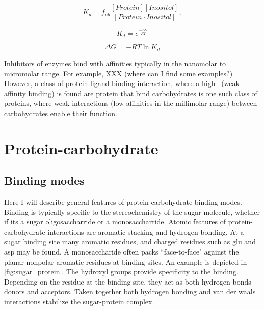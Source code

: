      \begin{equation}
        K_{d} = f_{ub}\frac{\left[ Protein \right]\left[ Inositol \right]}{\left[Protein \cdot Inositol\right]},
     \end{equation}
     
     \begin{equation}
        K_{d} = e^{\frac{-\Delta G}{RT}}
     \end{equation}

     \begin{equation}
        \Delta G = -RT\ln K_d
     \end{equation}
     

Inhibitors of enzymes bind with affinities typically in the nanomolar to micromolar range.  For example, XXX (where can I find some examples?) However, a class of protein-ligand binding interaction, where a high \KD\ (weak affinity binding) is found are protein that bind carbohydrates is one such class of proteins, where weak interactions (low affinities in the millimolar range) between carbohydrates enable their function.

\section{Protein-carbohydrate}

\subsection{Binding modes}
Here I will describe general features of protein-carbohydrate binding modes. Binding is typically specific to the stereochemistry of the sugar molecule, whether if its a sugar oligosaccharride or a monosaccharride. Atomic features of protein-carbohydrate interactions are aromatic stacking and hydrogen bonding.\cite{Vyas:1991p6498}  At a sugar binding site many aromatic residues, and charged residues such as glu and asp may be found. A monosaccharide often packs ``face-to-face" against the planar nonpolar aromatic residues at binding sites.  An example is depicted in \ref{fig:sugar_protein}.  The hydroxyl groups provide specificity to the binding.  Depending on the residue at the binding site, they act as both hydrogen bonds donors and acceptors. Taken together both hydrogen bonding and van der waals interactions stabilize the sugar-protein complex.

